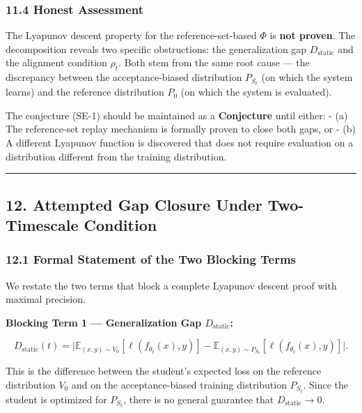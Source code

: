\documentclass[
  12pt,
]{article}
\begin{document}
\subsubsection{11.4 Honest Assessment}\label{honest-assessment}

The Lyapunov descent property for the reference-set-based \(\Phi\) is
\textbf{not proven}. The decomposition reveals two specific
obstructions: the generalization gap \(D_{\text{static}}\) and the
alignment condition \(\rho_t\). Both stem from the same root cause ---
the discrepancy between the acceptance-biased distribution \(P_{S_t}\)
(on which the system learns) and the reference distribution \(P_0\) (on
which the system is evaluated).

The conjecture (SE-1) should be maintained as a \textbf{Conjecture}
until either: - (a) The reference-set replay mechanism is formally
proven to close both gaps, or - (b) A different Lyapunov function is
discovered that does not require evaluation on a distribution different
from the training distribution.

\begin{center}\rule{0.5\linewidth}{0.5pt}\end{center}

\subsection{12. Attempted Gap Closure Under Two-Timescale
Condition}\label{attempted-gap-closure-under-two-timescale-condition}

\subsubsection{12.1 Formal Statement of the Two Blocking
Terms}\label{formal-statement-of-the-two-blocking-terms}

We restate the two terms that block a complete Lyapunov descent proof
with maximal precision.

\textbf{Blocking Term 1 --- Generalization Gap \(D_{\text{static}}\):}

\[D_{\text{static}}(t) = \bigl|\mathbb{E}_{(x,y) \sim V_0}[\ell(f_{\theta_t}(x), y)] - \mathbb{E}_{(x,y) \sim P_{S_t}}[\ell(f_{\theta_t}(x), y)]\bigr|.\]

This is the difference between the student's expected loss on the
reference distribution \(V_0\) and on the acceptance-biased training
distribution \(P_{S_t}\). Since the student is optimized for
\(P_{S_t}\), there is no general guarantee that
\(D_{\text{static}} \to 0\).
\end{document}
